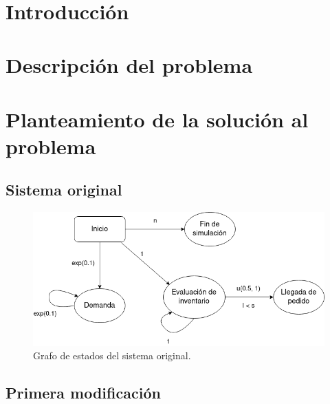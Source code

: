 \documentclass[12pt, spanish]{article}
\makeatletter
\let\thedate\@date
\makeatother
\begin{document}
\begin{titlepage}
    {\large \thedate}\\[0.5cm]
    {\doclicenseThis}

    \vfill

\end{titlepage}


\tableofcontents
\pagebreak



\section*{Introducción}


\section{Descripción del problema}


\section{Planteamiento de la solución al problema}

\subsection{Sistema original}

\begin{figure}[H]
  \centering
   \includegraphics[width=\textwidth]{grafo_sucesos_original.png}
	\caption{Grafo de estados del sistema original.}
\end{figure}


\subsection{Primera modificación}
\end{document}
